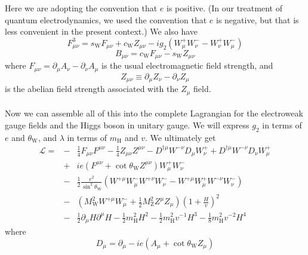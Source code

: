Here we are adopting the convention that $e$ is positive. (In our treatment of quantum electrodynamics, we used the convention that $e$ is negative, but that is less convenient in the present context.)
We also have
\[F^3_{\mu\nu} = s_{\mathrm{W}}F_{\mu\nu} + c_{\mathrm{W}} Z_{\mu\nu} -ig_2(W_{\mu}^+ W_{\nu}^- - W_{\nu}^+ W_{\mu}^-)\]
\[B_{\mu\nu} = c_{\mathrm{W}}F_{\mu\nu} - s_{\mathrm{W}} Z_{\mu\nu}\]
where $F_{\mu\nu} = \partial_{\mu}A_{\nu} - \partial_{\nu}A_{\mu}$ is the usual electromagnetic field strength, and
\[Z_{\mu\nu} \equiv \partial_{\mu}Z_{\nu} - \partial_{\nu}Z_{\mu}\]
is the abelian field strength associated with the $Z_{\mu}$ field.
\\ \\
Now we can assemble all of this into the complete Lagrangian for the electroweak gauge fields and the Higgs boson in unitary gauge. We will express $g_2$ in terms of $e$ and $\theta_{\mathrm{W}}$, and $\lambda$ in terms of $m_{\mathrm{H}}$ and
$v$. We ultimately get
\begin{eqnarray}
\mathcal{L} = &-& \frac{1}{4} F_{\mu\nu}F^{\mu\nu} - \frac{1}{4} Z_{\mu\nu}Z^{\mu\nu} - D^{\dagger\mu}W^{-\nu}D_{\mu}W^{+}_{\nu} + D^{\dagger\mu}W^{-\nu}D_{\nu}W^{+}_{\mu} \nonumber \\
&+& ie(F^{\mu\nu} + \cot\theta_{\mathrm{W}} Z^{\mu\nu})W_{\mu}^+ W_{\nu}^- \nonumber \\
&-& \frac{1}{2} \frac{e^2}{\sin^2\theta_{\mathrm{W}}} (W^{+\mu}W_{\mu}^{-}W^{+\nu}W_{\nu}^{-} -W^{+\mu}W_{\mu}^{+}W^{-\nu}W_{\nu}^{-} ) \nonumber \\
&-& (M_{\mathrm{W}}^2 W^{+\mu} W^{-}_{\mu} + \frac{1}{2}M_{\mathrm{Z}}^2 Z^{\mu}Z_{\mu})(1 + \frac{H}{v})^2 \nonumber \\
&-& \frac{1}{2}\partial_{\mu}H \partial^{\mu}H  - \frac{1}{2}m_{\mathrm{H}}^2 H^2  - \frac{1}{2}m_{\mathrm{H}}^2 v^{-1} H^3 -  \frac{1}{8}m_{\mathrm{H}}^2 v^{-2}H^4 \nonumber
\end{eqnarray}
where
\[D_{\mu} = \partial_{\mu} -ie(A_{\mu} + \cot\theta_{\mathrm{W}}Z_{\mu})\]

